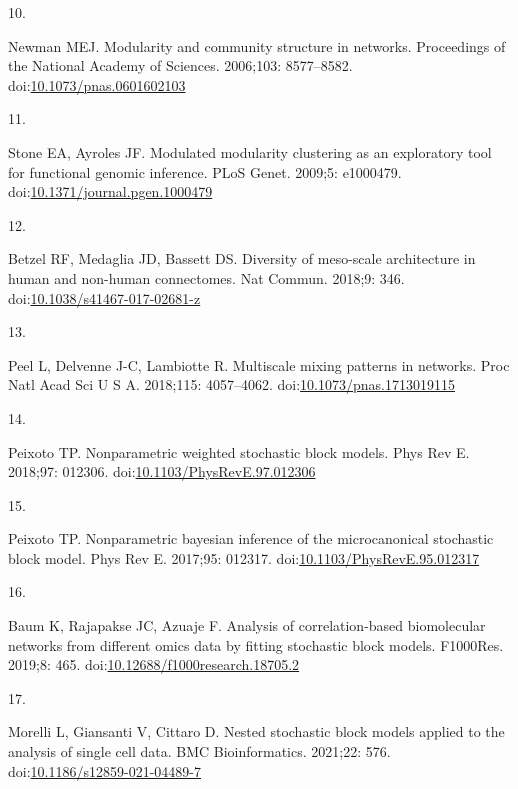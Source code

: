 \documentclass[
]{article}
\newlength{\cslhangindent}
\newlength{\csllabelwidth}
\newenvironment{CSLReferences}[2] %
 {\begin{list}{}{%
  \setlength{\itemindent}{0pt}
  \setlength{\leftmargin}{0pt}
  \setlength{\parsep}{0pt}
  \ifodd #1
   \setlength{\leftmargin}{\cslhangindent}
   \setlength{\itemindent}{-1\cslhangindent}
  \fi
  \setlength{\itemsep}{#2\baselineskip}}}
 {\end{list}}
\newcommand{\CSLLeftMargin}[1]{\parbox[t]{\csllabelwidth}{\strut#1\strut}}
\newcommand{\CSLRightInline}[1]{\parbox[t]{\linewidth - \csllabelwidth}{\strut#1\strut}}
\begin{document}
\begin{CSLReferences}{0}{1}
\CSLLeftMargin{10. }%
\CSLRightInline{Newman MEJ. {Modularity and community structure in
networks}. Proceedings of the National Academy of Sciences. 2006;103:
8577--8582.
doi:\href{https://doi.org/10.1073/pnas.0601602103}{10.1073/pnas.0601602103}}

\CSLLeftMargin{11. }%
\CSLRightInline{Stone EA, Ayroles JF. Modulated modularity clustering as
an exploratory tool for functional genomic inference. PLoS Genet.
2009;5: e1000479.
doi:\href{https://doi.org/10.1371/journal.pgen.1000479}{10.1371/journal.pgen.1000479}}

\CSLLeftMargin{12. }%
\CSLRightInline{Betzel RF, Medaglia JD, Bassett DS. Diversity of
meso-scale architecture in human and non-human connectomes. Nat Commun.
2018;9: 346.
doi:\href{https://doi.org/10.1038/s41467-017-02681-z}{10.1038/s41467-017-02681-z}}

\CSLLeftMargin{13. }%
\CSLRightInline{Peel L, Delvenne J-C, Lambiotte R. Multiscale mixing
patterns in networks. Proc Natl Acad Sci U S A. 2018;115: 4057--4062.
doi:\href{https://doi.org/10.1073/pnas.1713019115}{10.1073/pnas.1713019115}}

\CSLLeftMargin{14. }%
\CSLRightInline{Peixoto TP. Nonparametric weighted stochastic block
models. Phys Rev E. 2018;97: 012306.
doi:\href{https://doi.org/10.1103/PhysRevE.97.012306}{10.1103/PhysRevE.97.012306}}

\CSLLeftMargin{15. }%
\CSLRightInline{Peixoto TP. Nonparametric bayesian inference of the
microcanonical stochastic block model. Phys Rev E. 2017;95: 012317.
doi:\href{https://doi.org/10.1103/PhysRevE.95.012317}{10.1103/PhysRevE.95.012317}}

\CSLLeftMargin{16. }%
\CSLRightInline{Baum K, Rajapakse JC, Azuaje F. Analysis of
correlation-based biomolecular networks from different omics data by
fitting stochastic block models. F1000Res. 2019;8: 465.
doi:\href{https://doi.org/10.12688/f1000research.18705.2}{10.12688/f1000research.18705.2}}

\CSLLeftMargin{17. }%
\CSLRightInline{Morelli L, Giansanti V, Cittaro D. Nested stochastic
block models applied to the analysis of single cell data. BMC
Bioinformatics. 2021;22: 576.
doi:\href{https://doi.org/10.1186/s12859-021-04489-7}{10.1186/s12859-021-04489-7}}


\end{CSLReferences}
\end{document}
